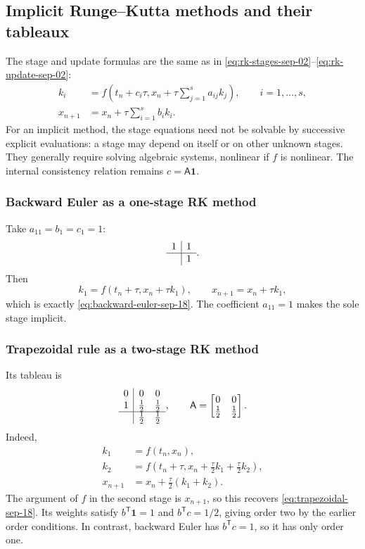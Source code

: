 \subsection{Implicit Runge--Kutta methods and their tableaux}

The stage and update formulas are the same as in
\eqref{eq:rk-stages-sep-02}--\eqref{eq:rk-update-sep-02}:
\begin{align*}
 k_i&=f\left(t_n+c_i\tau,
      x_n+\tau\sum_{j=1}^{s}a_{ij}k_j\right),
      \qquad i=1,\ldots,s,\\
 x_{n+1}&=x_n+\tau\sum_{i=1}^{s}b_i k_i.
\end{align*}
For an implicit method, the stage equations need not be solvable by
successive explicit evaluations: a stage may depend on itself or on
other unknown stages. They generally require solving algebraic
systems, nonlinear if \(f\) is nonlinear. The internal consistency
relation remains \(c=\mathsf A\mathbf1\).

\subsubsection{Backward Euler as a one-stage RK method}

Take \(a_{11}=b_1=c_1=1\):
\[
 \begin{array}{c|c}1&1\\\hline &1\end{array}.
\]
Then
\[
 k_1=f(t_n+\tau,x_n+\tau k_1),\qquad x_{n+1}=x_n+\tau k_1,
\]
which is exactly \eqref{eq:backward-euler-sep-18}. The coefficient
\(a_{11}=1\) makes the sole stage implicit.

\subsubsection{Trapezoidal rule as a two-stage RK method}

Its tableau is
\[
 \begin{array}{c|cc}
  0&0&0\\
  1&\tfrac12&\tfrac12\\\hline
   &\tfrac12&\tfrac12
 \end{array},
 \qquad
 \mathsf A=\begin{bmatrix}0&0\\\tfrac12&\tfrac12\end{bmatrix}.
\]
Indeed,
\begin{align*}
 k_1&=f(t_n,x_n),\\
 k_2&=f\left(t_n+\tau,x_n+\frac\tau2k_1+\frac\tau2k_2\right),\\
 x_{n+1}&=x_n+\frac\tau2(k_1+k_2).
\end{align*}
The argument of \(f\) in the second stage is \(x_{n+1}\), so this
recovers \eqref{eq:trapezoidal-sep-18}. Its weights satisfy
\(b^{\mathsf T}\mathbf1=1\) and \(b^{\mathsf T}c=1/2\), giving order
two by the earlier order conditions. In contrast, backward Euler has
\(b^{\mathsf T}c=1\), so it has only order one.

